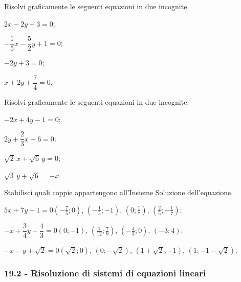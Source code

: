 \begin{esercizio}
 \label{ese:19.4}
Risolvi graficamente le seguenti equazioni in due incognite.
\begin{multicols}{2}
 \begin{enumeratea}
\spazielenx
\item $2x-2y+3=0$;
\item $-{\dfrac{1}{5}}x-\dfrac{5}{2}y+1=0$;
\item $-2y+3=0$;
\item $x+2y+\dfrac{7}{4}=0$.
\end{enumeratea}
\end{multicols}
\end{esercizio}

\begin{esercizio}
 \label{ese:19.5}
Risolvi graficamente le seguenti equazioni in due incognite.
\begin{multicols}{2}
 \begin{enumeratea}
\spazielenx
\item $-2x+4y-1=0$;
\item $2y+\dfrac{2}{3}x+6=0$;
\item $\sqrt{2}\,x+\sqrt{6}\,y=0$;
\item $\sqrt{3}\,y+\sqrt{6}=-x$.
 \end{enumeratea}
\end{multicols}
\end{esercizio}

\begin{esercizio}
 \label{ese:19.6}
 Stabilisci quali coppie appartengono all'Insieme Soluzione dell'equazione.
\TabPositions{4cm}
\begin{enumeratea}
\item $5x+7y-1=0$\tab$\left(-\frac{7}{5};0\right)$, $\left(-\frac{1}{5};-1\right)$, $\left(0;\frac{1}{7}\right)$, $\left(\frac{2}{5};-\frac{1}{7}\right)$;
\item $-x+\dfrac{3}{4}y-\dfrac{4}{3}=0$\tab$(0;-1)$, $\left(\frac{1}{12};\frac{7}{9}\right)$, $\left(-\frac{4}{3};0\right)$, $(-3;4)$;
\item $-x-y+\sqrt{2}=0$\tab$\left(\sqrt{2};0\right)$, $\left(0;-\sqrt{2}\right)$, $\left(1+\sqrt{2};-1\right)$, $\left(1;-1-\sqrt{2}\right)$.
\end{enumeratea}
\end{esercizio}

\subsubsection*{19.2 - Risoluzione di sistemi di equazioni lineari}

